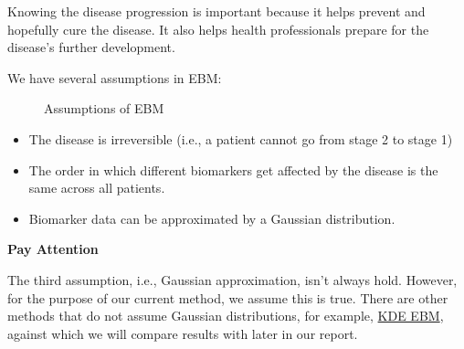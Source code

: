 \documentclass[
  letterpaper,
  DIV=11,
  numbers=noendperiod]{scrreprt}
\providecommand{\tightlist}{%
  \setlength{\itemsep}{0pt}\setlength{\parskip}{0pt}}\usepackage{longtable,booktabs,array}
\begin{document}
Knowing the disease progression is important because it helps prevent
and hopefully cure the disease. It also helps health professionals
prepare for the disease's further development.

We have several assumptions in EBM:

\begin{figure}


\caption{\label{fig-ebm-assumptions}Assumptions of EBM}

\end{figure}%

\begin{itemize}
\tightlist
\item
  The disease is irreversible (i.e., a patient cannot go from stage 2 to
  stage 1)
\item
  The order in which different biomarkers get affected by the disease is
  the same across all patients.
\item
  Biomarker data can be approximated by a Gaussian distribution.
\end{itemize}

\begin{tcolorbox}[enhanced jigsaw, rightrule=.15mm, opacityback=0, leftrule=.75mm, colframe=quarto-callout-note-color-frame, colback=white, bottomrule=.15mm, toprule=.15mm, arc=.35mm, left=2mm, breakable]
\begin{minipage}[t]{5.5mm}
\textcolor{quarto-callout-note-color}{\faInfo}
\end{minipage}%
\begin{minipage}[t]{\textwidth - 5.5mm}

\vspace{-3mm}\textbf{Pay Attention}\vspace{3mm}

The third assumption, i.e., Gaussian approximation, isn't always hold.
However, for the purpose of our current method, we assume this is true.
There are other methods that do not assume Gaussian distributions, for
example, \href{https://github.com/ucl-pond/kde_ebm}{KDE EBM}, against
which we will compare results with later in our report.

\end{minipage}%
\end{tcolorbox}
\end{document}
